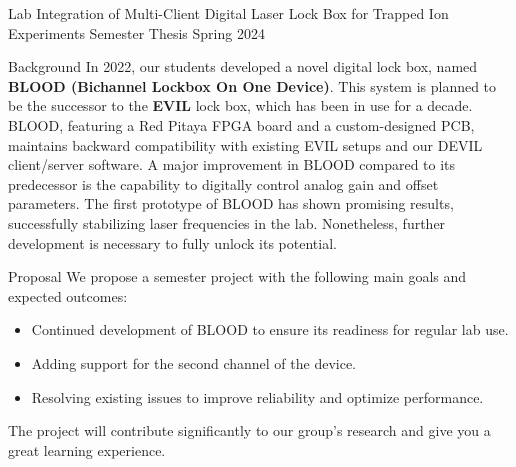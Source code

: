 \documentclass{project-proposal}
\begin{document}
\setmaintextfont
\makepage

\makeheader
{Lab Integration of Multi-​Client Digital Laser Lock Box for Trapped Ion Experiments} %
{Semester Thesis} %
{Spring 2024} %

\begin{section}{Background}
 In 2022, our students developed a novel digital lock box, named
 \textbf{BLOOD (Bichannel Lockbox On One Device)}. This system is planned to be the
 successor to the \textbf{EVIL} lock box, which has been in use for a
 decade. BLOOD, featuring a Red Pitaya FPGA board and a custom-designed PCB,
 maintains backward compatibility with existing EVIL setups and our DEVIL client/server
 software. A major improvement in BLOOD compared to its predecessor is the
 capability to digitally control analog gain and offset parameters. The first prototype
 of BLOOD has shown promising results, successfully stabilizing laser frequencies in
 the lab. Nonetheless, further development is necessary to fully unlock its potential.
\end{section}

\begin{section}{Proposal}
 We propose a semester project with the following main goals and expected outcomes:

 \begin{itemize}
     \item {Continued development of BLOOD to ensure its readiness for regular lab use.}
     \item {Adding support for the second channel of the device.}
     \item {Resolving existing issues to improve reliability and optimize performance.}
 \end{itemize}

 The project will contribute significantly to our group's research and
 give you a great learning experience.
\end{section}
\end{document}
